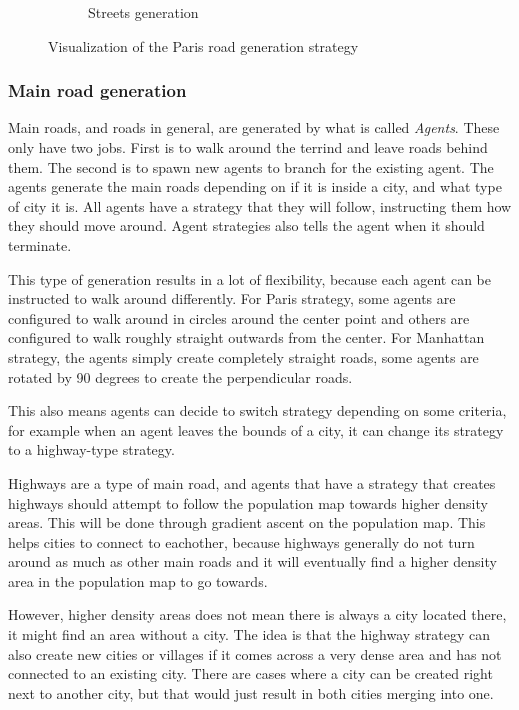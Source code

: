 \begin{center}
\begin{figure}[H]
\begin{subfigure}[b]{0.4\textwidth}
      \caption{Streets generation}
      \label{fig:gen_road_paris_streets}
    \end{subfigure}
    \caption{Visualization of the Paris road generation strategy}
    \label{fig:gen_road_paris_visualization}
  \end{figure}
\end{center}

\subsubsection{Main road generation}
Main roads, and roads in general, are generated by what is called \textit{Agents}.
These only have two jobs.
First is to walk around the terrind and leave roads behind them.
The second is to spawn new agents to branch for the existing agent.
The agents generate the main roads depending on if it is inside a city, and what type of city it is.
All agents have a strategy that they will follow, instructing them how they should move around.
Agent strategies also tells the agent when it should terminate.

This type of generation results in a lot of flexibility, because each agent can be instructed to walk around differently.
For Paris strategy, some agents are configured to walk around in circles around the center point and others are configured to walk roughly straight outwards from the center.
For Manhattan strategy, the agents simply create completely straight roads, some agents are rotated by 90 degrees to create the perpendicular roads.

This also means agents can decide to switch strategy depending on some criteria, for example when an agent leaves the bounds of a city, it can change its strategy to a highway-type strategy.

Highways are a type of main road, and agents that have a strategy that creates highways should attempt to follow the population map towards higher density areas.
This will be done through gradient ascent on the population map.
This helps cities to connect to eachother, because highways generally do not turn around as much as other main roads and it will eventually find a higher density area in the population map to go towards.

However, higher density areas does not mean there is always a city located there, it might find an area without a city.
The idea is that the highway strategy can also create new cities or villages if it comes across a very dense area and has not connected to an existing city.
There are cases where a city can be created right next to another city, but that would just result in both cities merging into one.


